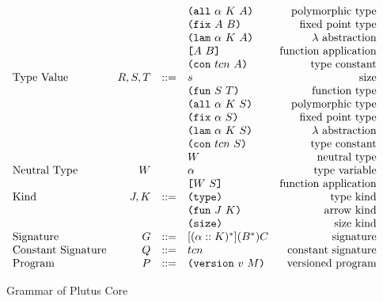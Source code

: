 \documentclass[../main.tex]{subfiles}
\begin{document}
\begin{figure*}[t]
\[\begin{array}{lrclr}
                                  &        &     & \texttt{(} \texttt{all} ~ \alpha ~ K ~ A \texttt{)}        & \textrm{polymorphic type}\\
                                  &        &     & \texttt{(} \texttt{fix} ~ A ~ B \texttt{)}                & \textrm{fixed point type}\\
                                  &        &     & \texttt{(} \texttt{lam} ~ \alpha ~ K ~ A \texttt{)}        & \textrm{$\lambda$ abstraction}\\
                                  &        &     & \texttt{[} A ~ B \texttt{]}                & \textrm{function application}\\
                                  &        &     & \texttt{(} \texttt{con} ~ tcn ~ A \texttt{)}          & \textrm{type constant}\\
        \textrm{Type Value}       & R,S,T  & ::= & s                          & \textrm{size}\\
                                  &        &     & \texttt{(} \texttt{fun} ~ S ~ T \texttt{)}                & \textrm{function type}\\
                                  &        &     & \texttt{(} \texttt{all} ~ \alpha ~ K ~ S \texttt{)}        & \textrm{polymorphic type}\\
                                  &        &     & \texttt{(} \texttt{fix} ~ \alpha ~ S \texttt{)}           & \textrm{fixed point type}\\
                                  &        &     & \texttt{(} \texttt{lam} ~ \alpha ~ K ~ S \texttt{)}        & \textrm{$\lambda$ abstraction}\\
                                  &        &     & \texttt{(} \texttt{con} ~ tcn ~ S \texttt{)}          & \textrm{type constant}\\
                                  &        &     & W                          & \textrm{neutral type}\\
        \textrm{Neutral Type}     & W      &     & \alpha                     & \textrm{type variable}\\
                                  &        &     & \texttt{[} W ~ S \texttt{]}                & \textrm{function application}\\
        \textrm{Kind}             & J,K    & ::= & \texttt{(} \texttt{type} \texttt{)}{}                   & \textrm{type kind}\\
                                  &        &     & \texttt{(} \texttt{fun} ~ J ~ K \texttt{)}                & \textrm{arrow kind}\\
                                  &        &     & \texttt{(} \texttt{size} \texttt{)}{}                   & \textrm{size kind}\\
        \textrm{Signature}        & G      & ::= & [(\alpha :: K)^*](B^*)C     & \textrm{signature}\\
        \textrm{Constant Signature}   & Q      & ::= & tcn                        & \textrm{constant signature}\\
        \textrm{Program}          & P      & ::= & \texttt{(} \texttt{version} ~ v ~ M \texttt{)}             & \textrm{versioned program}\\

    \end{array}\]
    \caption{Grammar of Plutus Core}
    \label{fig:Plutus_core_grammar}
\end{figure*}
\end{document}
